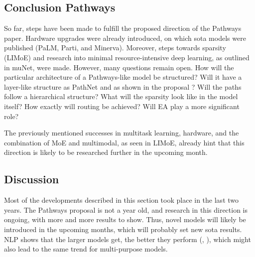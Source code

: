 \documentclass[
]{krantz}
\begin{document}
\hypertarget{conclusion-pathways}{%
\subsection{Conclusion Pathways}\label{conclusion-pathways}}

So far, steps have been made to fulfill the proposed direction of the Pathways paper. Hardware upgrades were already introduced, on which sota models were published (PaLM, Parti, and Minerva). Moreover, steps towards sparsity (LIMoE) and research into minimal resource-intensive deep learning, as outlined in muNet, were made. However, many questions remain open. How will the particular architecture of a Pathways-like model be structured? Will it have a layer-like structure as PathNet and as shown in the proposal \citep{Dean21}? Will the paths follow a hierarchical structure? What will the sparsity look like in the model itself? How exactly will routing be achieved? Will EA play a more significant role?

The previously mentioned successes in multitask learning, hardware, and the combination of MoE and multimodal, as seen in LIMoE, already hint that this direction is likely to be researched further in the upcoming month.

\hypertarget{discussion-3}{%
\subsection{Discussion}\label{discussion-3}}

Most of the developments described in this section took place in the last two years. The Pathways proposal is not a year old, and research in this direction is ongoing, with more and more results to show.
Thus, novel models will likely be introduced in the upcoming months, which will probably set new sota results. NLP shows that the larger models get, the better they perform (\citet{Chowdhery2022}, \citet{brown2020language}), which might also lead to the same trend for multi-purpose models.
\end{document}
